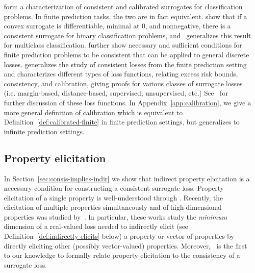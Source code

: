 \documentclass{article}
\begin{document}
\cite{zhang2004statistical,lin2004note,bartlett2006convexity,tewari2007consistency} form a characterization of consistent and calibrated surrogates for classification problems.
In finite prediction tasks, the two are in fact equivalent.  
\cite{bartlett2006convexity} show that if a convex surrogate is differentiable, minimal at $0$, and nonnegative, there is a consistent surrogate for binary classification problems, and~\cite{tewari2007consistency} generalizes this result for multiclass classification. 
\cite{ramaswamy2016convex} further show necessary and sufficient conditions for finite prediction problems to be consistent that can be applied to general discrete losses.
\cite{steinwart2007compare} generalizes the study of consistent losses from the finite prediction setting and characterizes different types of loss functions, relating excess risk bounds, consistency, and calibration, giving proofs for various classes of surrogate losses (i.e. margin-based, distance-based, supervised, unsupervised, etc.)
See~\cite[Chapter 2]{steinwart2008support} for further discussion of these loss functions.
In Appendix~\ref{app:calibration}, we give a more general definition of calibration which is equivalent to Definition~\ref{def:calibrated-finite} in finite prediction settings, but generalizes to infinite prediction settings.


\subsection{Property elicitation}\label{subsec:properties}
In Section~\ref{sec:consis-implies-indir} we show that indirect property elicitation is a necessary condition for constructing a consistent surrogate loss.
Property elicitation of a single property is well-understood through \cite{savage1971elicitation,osband1985information-eliciting,lambert2008eliciting, lambert2009eliciting, lambert2018elicitation}.
Recently, the elicitation of multiple properties simultaneously and of high-dimensional properties was studied by~\cite{frongillo2015vector-valued,fissler2015higher,frongillo2018elicitation}.
In particular, these works study the \emph{minimum} dimension of a real-valued loss needed to indirectly elicit (see Definition~\ref{def:indirectly-elicits} below) a property or vector of properties by directly eliciting other (possibly vector-valued) properties.
Moreover,~\cite{agarwal2015consistent} is the first to our knowledge to formally relate property elicitation to the consistency of a surrogate loss.
\end{document}

